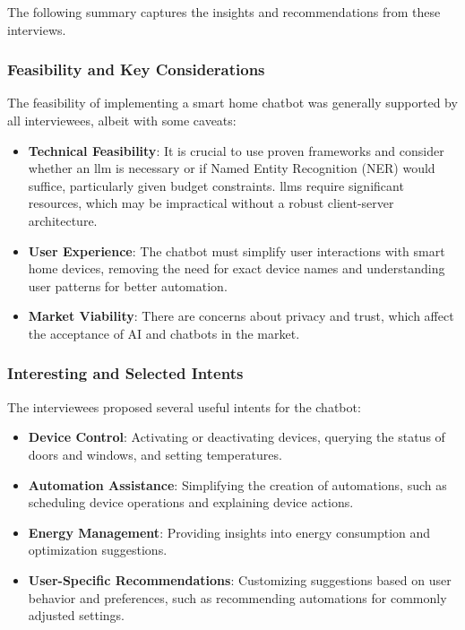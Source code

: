 The following summary captures the insights and recommendations from these interviews.

\subsubsection{Feasibility and Key Considerations}

The feasibility of implementing a smart home chatbot was generally supported by all interviewees, albeit with some caveats:

\begin{itemize}
    \item \textbf{Technical Feasibility}: It is crucial to use proven frameworks and consider whether an \gls{llm} is necessary or if Named Entity Recognition (NER) would suffice, particularly given budget constraints. \glspl{llm} require significant resources, which may be impractical without a robust client-server architecture.
    \item \textbf{User Experience}: The chatbot must simplify user interactions with smart home devices, removing the need for exact device names and understanding user patterns for better automation.
    \item \textbf{Market Viability}: There are concerns about privacy and trust, which affect the acceptance of AI and chatbots in the market.
\end{itemize}

\subsubsection{Interesting and Selected Intents}

The interviewees proposed several useful intents for the chatbot:

\begin{itemize}
    \item \textbf{Device Control}: Activating or deactivating devices, querying the status of doors and windows, and setting temperatures.
    \item \textbf{Automation Assistance}: Simplifying the creation of automations, such as scheduling device operations and explaining device actions.
    \item \textbf{Energy Management}: Providing insights into energy consumption and optimization suggestions.
    \item \textbf{User-Specific Recommendations}: Customizing suggestions based on user behavior and preferences, such as recommending automations for commonly adjusted settings.
\end{itemize}

